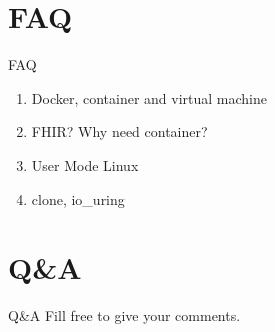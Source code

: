\documentclass{beamer}
\begin{document}
\section{FAQ}
\begin{frame}{FAQ}
    \begin{enumerate}
        \item Docker, container and virtual machine
        \item FHIR? Why need container?
        \item User Mode Linux
        \item clone, io\_uring
    \end{enumerate}
\end{frame}

\section{Q\&A}
\begin{frame}{Q\&A}
    \centering
    \Large Fill free to give your comments.
\end{frame}
\end{document}
